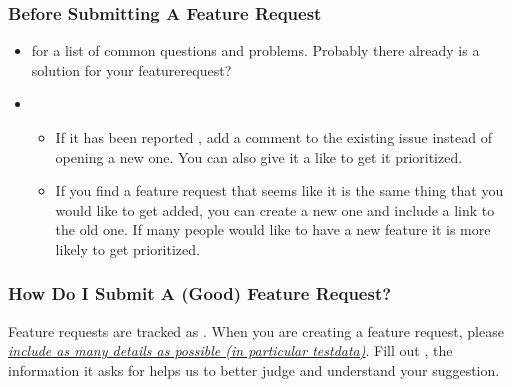 \documentclass[a4paper,10pt,english]{sphinxmanual}
\begin{document}
\subsubsection{Before Submitting A Feature Request}
\label{\detokenize{CONTRIBUTING:before-submitting-a-feature-request}}\begin{itemize}
\item {}
\sphinxAtStartPar
{} for a list of common questions and problems. Probably there already is a solution for your feature\sphinxhyphen{}request?

\item {}
\sphinxAtStartPar
{}
\begin{itemize}
\item {}
\sphinxAtStartPar
If it has been reported , add a comment to the existing issue instead of opening a new one. You can also give it a like to get it prioritized.

\item {}
\sphinxAtStartPar
If you find a  feature request that seems like it is the same thing that you would like to get added, you can create a new one and include a link to the old one. If many people would like to have a new feature it is more likely to get prioritized.

\end{itemize}

\end{itemize}


\subsubsection{How Do I Submit A (Good) Feature Request?}
\label{\detokenize{CONTRIBUTING:how-do-i-submit-a-good-feature-request}}
\sphinxAtStartPar
Feature requests are tracked as . When you are creating a feature request, please {\hyperref[\detokenize{CONTRIBUTING:how-do-i-submit-a-good-feature-request}]{\emph{include as many details as possible (in particular test\sphinxhyphen{}data)}}}. Fill out , the information it asks for helps us to better judge and understand your suggestion.
\end{document}
